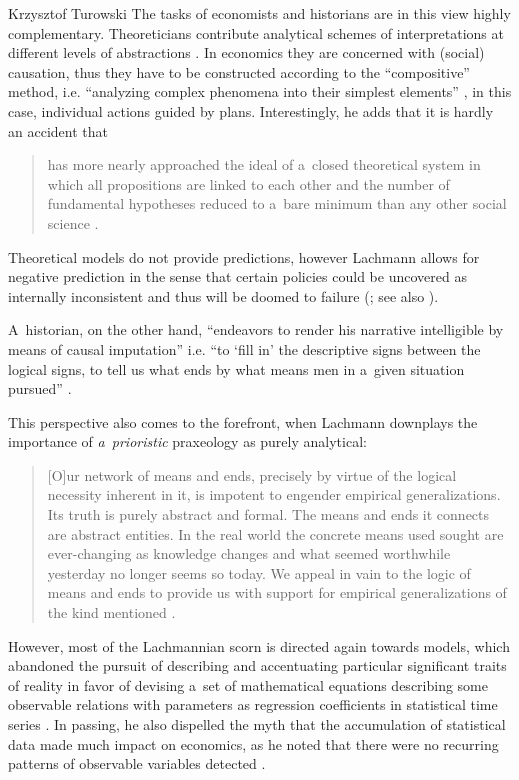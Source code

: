 \begin{artengenv}{Krzysztof Turowski}
The tasks of economists and historians are in this view highly complementary.
Theoreticians contribute analytical schemes of interpretations at different levels of abstractions \parencite[179]{lachmann-science}. In economics they are concerned with (social) causation, thus they have to be constructed according to the ``compositive'' method, i.e. ``analyzing complex phenomena into their simplest elements'' \parencite[172]{lachmann-science}, in this case, individual actions guided by plans.
Interestingly, he adds that it is hardly an accident that
\begin{quote}
has more nearly approached the ideal of a~closed theoretical system in which all propositions are linked to each other and the number of fundamental hypotheses reduced to a~bare minimum than any other social science \parencite[179]{lachmann-science}.
\end{quote}
Theoretical models do not provide predictions, however Lachmann allows for negative prediction in the sense that certain policies could be uncovered as internally inconsistent and thus will be doomed to failure (\cite[89]{lachmann-shackle-time}; see also \cite[7--8]{lachmann-shackle-place}).

A~historian, on the other hand, ``endeavors to render his narrative intelligible by means of causal imputation'' \parencite[178]{lachmann-science} i.e. ``to `fill in' the descriptive signs between the logical signs, to tell us what ends by what means men in a~given situation pursued'' \parencite[175]{lachmann-science}.

This perspective also comes to the forefront, when Lachmann downplays the importance of \emph{a~prioristic} praxeology as purely analytical:
\begin{quote}
[O]ur network of means and ends, precisely by virtue of the logical necessity inherent in it, is impotent to engender empirical generalizations. Its truth is purely abstract and formal. The means and ends it connects are abstract entities. In the real world the concrete means used sought are ever-changing as knowledge changes and what seemed worthwhile yesterday no longer seems so today. We appeal in vain to the logic of means and ends to provide us with support for empirical generalizations of the kind mentioned \parencite[31]{lachmann1986market}.
\end{quote}

However, most of the Lachmannian scorn is directed again towards models, which abandoned the pursuit of describing and accentuating particular significant traits of reality in favor of devising a~set of mathematical equations describing some observable relations with parameters as regression coefficients in statistical time series \parencite[35]{lachmann1986market}.
In passing, he also dispelled the myth that the accumulation of statistical data made much impact on economics, as he noted that there were no recurring patterns of observable variables detected \parencite[177]{lachmann-science}.


\end{artengenv}
